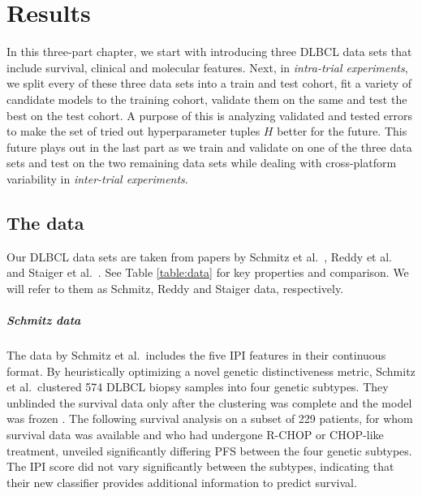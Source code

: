 \chapter{Results} \label{chap:results}

In this three-part chapter, we start with introducing three DLBCL data sets that include 
survival, clinical and molecular features. Next, in \textit{intra-trial experiments}, we split 
every of these three data sets into a train and test cohort, fit a variety of candidate models to 
the training cohort, validate them on the same and test the best on the test cohort. A purpose of 
this is analyzing validated and tested errors to make the set of tried out hyperparameter tuples 
$H$ better for the future. This future 
plays out in the last part as we train and validate on one of the three data sets and test on 
the two remaining data sets while dealing with cross-platform variability in 
\textit{inter-trial experiments}.

\section{The data}\label{sec:data}

Our DLBCL data sets are taken from papers by Schmitz et al.\ \cite{schmitz18}, Reddy et al.\ 
\cite{reddy17} and Staiger et al.\ \cite{staiger20}. See Table \ref{table:data} for key properties 
and comparison. We will refer to them as Schmitz, Reddy and Staiger data, respectively.



\paragraph{Schmitz data}
The data by Schmitz et al.\ includes the five IPI features in their continuous format. 
By heuristically optimizing a novel genetic distinctiveness metric, Schmitz et al.\ 
clustered \num{574} DLBCL biopsy samples into four genetic subtypes. They 
unblinded the survival data only after the clustering was complete and the 
model was frozen \cite[Appendix 1, pp. 16--18]{schmitz18}. The following survival analysis 
on a subset of \num{229} patients, for whom survival data was available and who had undergone R-CHOP 
or CHOP-like treatment, unveiled significantly differing PFS between the four genetic subtypes. The 
IPI score did not vary significantly between the subtypes, 
indicating that their new classifier provides additional information to predict survival.


